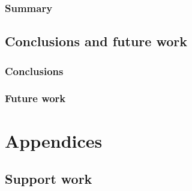 \documentclass[
  oneside,
  11pt, a4paper,
  footinclude=true,
  headinclude=true,
  cleardoublepage=empty
]{scrbook}
\begin{document}
\section{Summary}


\chapter{Conclusions and future work}
\section{Conclusions}
\section{Future work}
		
\cleardoublepage


\printindex
	
	\appendix
	\renewcommand\chaptername{Appendix}


\part{Appendices}

\chapter{Support work}
\end{document}
